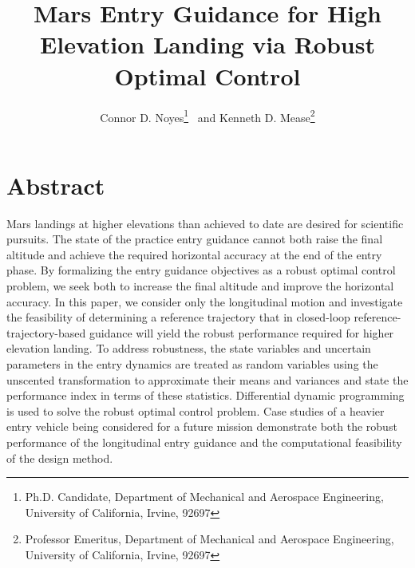 \documentclass[journal ]{new-aiaa}
\title{Mars Entry Guidance for High Elevation Landing via Robust Optimal Control}
\begin{document}
\author{Connor D. Noyes\thanks{Ph.D. Candidate, Department of Mechanical and Aerospace Engineering, University of California, Irvine, 92697} \ and Kenneth D. Mease\thanks{Professor Emeritus, Department of Mechanical and Aerospace Engineering, University of California, Irvine, 92697}}
\maketitle




\section*{Abstract}
Mars landings at higher elevations than achieved to date are desired for scientific pursuits. The state of the practice entry guidance cannot both raise the final altitude and achieve the required horizontal accuracy at the end of the entry phase. By formalizing the entry guidance objectives as a robust optimal control problem, we seek both to increase the final altitude and improve the horizontal accuracy. In this paper, we consider only the longitudinal motion and investigate the feasibility of determining a reference trajectory that in closed-loop reference-trajectory-based guidance will yield the robust performance required for higher elevation landing. To address robustness, the state variables and uncertain parameters in the entry dynamics are treated as random variables using the unscented transformation to approximate their means and variances and state the performance index in terms of these statistics. Differential dynamic programming is used to solve the robust optimal control problem. Case studies of a heavier entry vehicle being considered for a future mission demonstrate both the robust performance of the longitudinal entry guidance and the computational feasibility of the design method.
\end{document}
